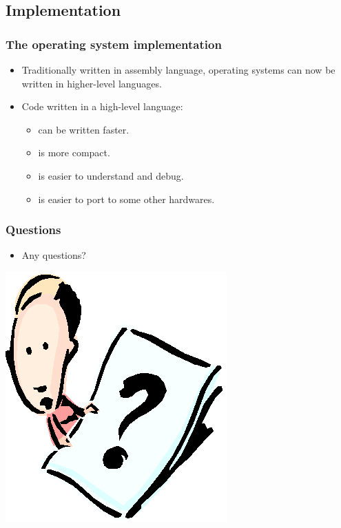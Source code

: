 \documentclass[CJKutf8,xcolor=pdftex,dvipsnames,table]{beamer}
\begin{document}
\begin{CJK*}{UTF8}{song}
  \subsection{Implementation}
  
  \begin{frame}
    \frametitle{The operating system implementation} \pause
    \begin{itemize}
    \item{Traditionally written in assembly language, operating systems can now be written in higher-level languages.} \pause
    \item{Code written in a high-level language:} \pause
      \begin{itemize}
      \item{can be written faster.} \pause
      \item{is more compact.} \pause
      \item{is easier to understand and debug.} \pause
      \item{is easier to port to some other hardwares.}
      \end{itemize}
    \end{itemize}
  \end{frame}
  
  \begin{frame}
    \frametitle{Questions}
    \begin{itemize}
    \item{Any questions?}
    \end{itemize}
    \begin{center}
      \includegraphics[scale=.5]{question}
    \end{center}
  \end{frame}
  
\end{CJK*}
\end{document}
